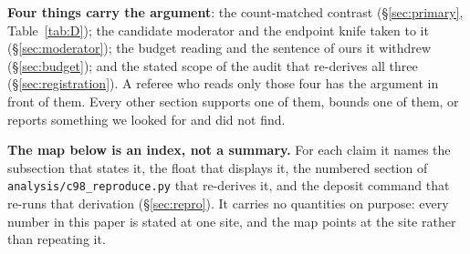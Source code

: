 \documentclass[10pt,letterpaper]{article}
\begin{document}
\textbf{Four things carry the argument}: the count-matched contrast
(\S\ref{sec:primary}, Table~\ref{tab:D}); the candidate moderator and the endpoint knife taken
to it (\S\ref{sec:moderator}); the budget reading and the sentence of ours it withdrew
(\S\ref{sec:budget}); and the stated scope of the audit that re-derives all three
(\S\ref{sec:registration}). A referee who reads only those four has the argument in front of
them. Every other section supports one of them, bounds one of them, or reports something we
looked for and did not find.

\textbf{The map below is an index, not a summary.} For each claim it names the subsection that
states it, the float that displays it, the numbered section of
\texttt{analysis/c98\_reproduce.py} that re-derives it, and the deposit command that re-runs that
derivation (\S\ref{sec:repro}). It carries no quantities on purpose: every number in this paper
is stated at one site, and the map points at the site rather than repeating it.
\end{document}
